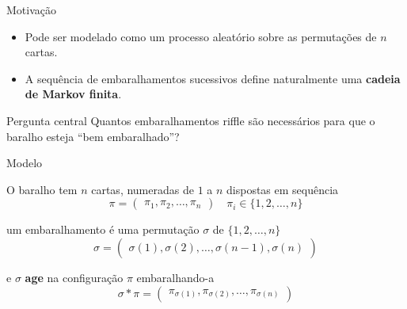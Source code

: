 \documentclass{beamer}
\begin{document}
\begin{frame}{Motivação}
\begin{itemize}

\item Pode ser modelado como um processo aleatório sobre as permutações
  de $n$ cartas.
\item A sequência de embaralhamentos sucessivos define naturalmente uma
  \textbf{cadeia de Markov finita}.
\end{itemize}

\vfill

\begin{block}{Pergunta central}
  Quantos embaralhamentos riffle são necessários para que o baralho
  esteja ``bem embaralhado''?
\end{block}

\vfill
\end{frame}
\begin{frame}{Modelo}

  O baralho tem $n$ cartas, numeradas de $1$ a $n$ dispostas em
  sequência
  $$\pi=
  \begin{pmatrix}
    \pi_1,\pi_2,\dots,\pi_n
  \end{pmatrix}\quad \pi_i\in \{1,2,\dots,n\}
  $$


  um embaralhamento é uma permutação $\sigma$ de $\{1,2,\dots,n\}$
  $$ \sigma =
  \begin{pmatrix}
    \sigma(1),\sigma(2),\dots,\sigma(n-1),\sigma(n)
  \end{pmatrix}
  $$

  e $\sigma$ \textbf{age} na configuração $\pi$ embaralhando-a
  $$
    \sigma \ast \pi  =
  \begin{pmatrix}
    \pi_{\sigma(1)},
    \pi_{\sigma(2)},
    \dots,
    \pi_{\sigma(n)}
  \end{pmatrix}
  $$
  
 
\end{frame}
\end{document}
